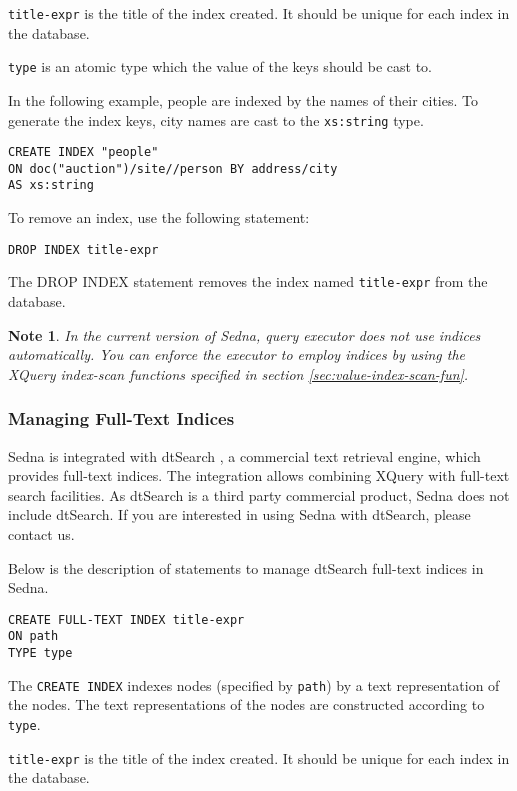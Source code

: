 \documentclass[a4paper,12pt]{article}
\newtheorem{note}{Note}
\begin{document}
\verb!title-expr! is the title of the index created. It should be unique for each index in the database.

\verb!type! is an atomic type which the value of the keys should be cast to.

In the following example, people are indexed by the names of their cities. To generate the index keys, city names are cast to the \verb!xs:string! type.
\begin{verbatim}
CREATE INDEX "people"
ON doc("auction")/site//person BY address/city
AS xs:string
\end{verbatim}

To remove an index, use the following statement:
\begin{verbatim}
DROP INDEX title-expr
\end{verbatim}

The DROP INDEX statement removes the index named \verb!title-expr! from the database.

\begin{note}In the current version of Sedna, query executor does not use indices automatically. You can enforce the executor to employ indices by
using the XQuery index-scan functions specified in section \ref{sec:value-index-scan-fun}.
\end{note}


\subsubsection{Managing Full-Text Indices}
\label{sec:managing-ft-indices}
Sedna is integrated with dtSearch \cite{link:dtsearch-engine}, a commercial text retrieval engine, which provides full-text indices. The integration allows combining XQuery with full-text search facilities. As dtSearch is a third party commercial product, Sedna does not include dtSearch. If you are interested in using Sedna with dtSearch, please contact us.

Below is the description of statements to manage dtSearch full-text indices in Sedna.

\begin{verbatim}
CREATE FULL-TEXT INDEX title-expr
ON path
TYPE type
\end{verbatim}

The \verb!CREATE INDEX! indexes nodes (specified by \verb!path!) by a text representation of the nodes. The text representations of the nodes are constructed according to \verb!type!.

\verb!title-expr! is the title of the index created. It should be unique for each index in the database.
\end{document}
